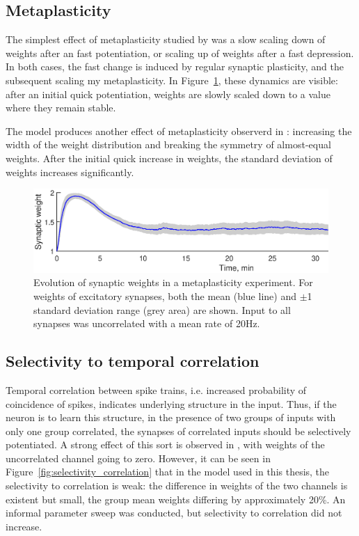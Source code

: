\documentclass[a4paper,12pt]{report}
\theoremstyle{definition}
\begin{document}
\subsection{Metaplasticity}

The simplest effect of metaplasticity studied by \cite{yeung2004synaptic} was a slow scaling down of weights after an fast potentiation, or scaling up of weights after a fast depression. In both cases, the fast change is induced by regular synaptic plasticity, and the subsequent scaling my metaplasticity. In Figure~\ref{fig:valid_metaplasticity_evolution}, these dynamics are visible: after an initial quick potentiation, weights are slowly scaled down to a value where they remain stable.

The model produces another effect of metaplasticity observerd in \cite{yeung2004synaptic}: increasing the width of the weight distribution and breaking the symmetry of almost-equal weights. After the initial quick increase in weights, the standard deviation of weights increases significantly.

\begin{figure}[h]
    \includegraphics[width=\textwidth]{figures/valid_metaplasticity_evolution.eps}
    \caption{Evolution of synaptic weights in a metaplasticity experiment. For weights of excitatory synapses, both the mean (blue line) and $\pm$1 standard deviation range (grey area) are shown. Input to all synapses was uncorrelated with a mean rate of 20Hz.}
    \label{fig:valid_metaplasticity_evolution}
\end{figure}




\subsection{Selectivity to temporal correlation} %

Temporal correlation between spike trains, i.e. increased probability of coincidence of spikes, indicates underlying structure in the input. Thus, if the neuron is to learn this structure, in the presence of two groups of inputs with only one group correlated, the synapses of correlated inputs should be selectively potentiated. A strong effect of this sort is observed in \cite{yeung2004synaptic}, with weights of the uncorrelated channel going to zero. However, it can be seen in Figure~\ref{fig:selectivity_correlation} that in the model used in this thesis, the selectivity to correlation is weak: the difference in weights of the two channels is existent but small, the group mean weights differing by approximately 20\%. An informal parameter sweep was conducted, but selectivity to correlation did not increase.
\end{document}
